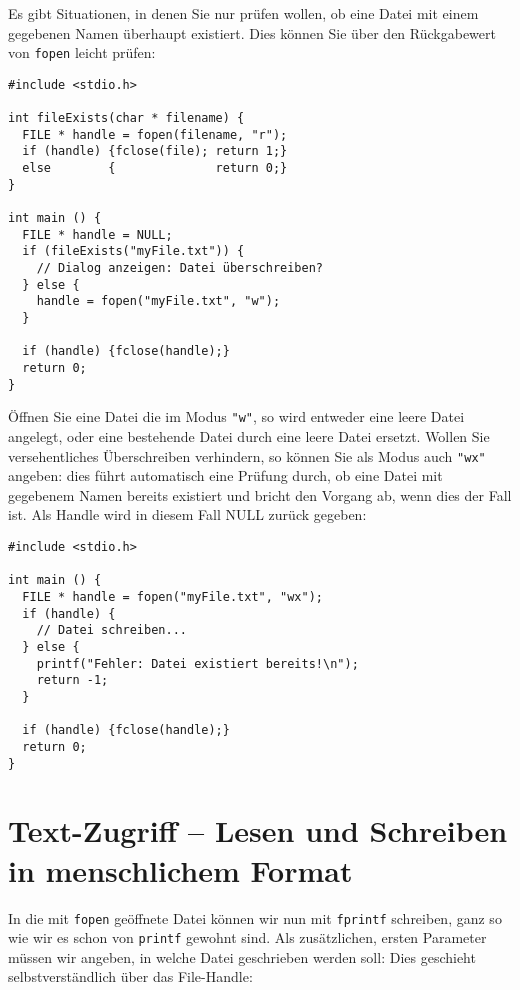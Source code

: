\begin{hintbox}
Es gibt Situationen, in denen Sie nur prüfen wollen, ob eine Datei mit einem gegebenen Namen überhaupt existiert. Dies können Sie über den Rückgabewert von \texttt{fopen} leicht prüfen:

\begin{codebox}
\begin{verbatim}
#include <stdio.h>

int fileExists(char * filename) {
  FILE * handle = fopen(filename, "r");
  if (handle) {fclose(file); return 1;}
  else        {              return 0;}
}

int main () {
  FILE * handle = NULL;
  if (fileExists("myFile.txt")) {
    // Dialog anzeigen: Datei überschreiben?
  } else {
    handle = fopen("myFile.txt", "w");
  }
  
  if (handle) {fclose(handle);}
  return 0;
}
\end{verbatim}
\end{codebox}
\end{hintbox}

\begin{hintbox}
Öffnen Sie eine Datei die im Modus \texttt{"w"}, so wird entweder eine leere Datei angelegt, oder eine bestehende Datei durch eine leere Datei ersetzt. Wollen Sie versehentliches Überschreiben verhindern, so können Sie als Modus auch \texttt{"wx"} angeben: dies führt automatisch eine Prüfung durch, ob eine Datei mit gegebenem Namen bereits existiert und bricht den Vorgang ab, wenn dies der Fall ist. Als Handle wird in diesem Fall NULL zurück gegeben:

\begin{codebox}
\begin{verbatim}
#include <stdio.h>

int main () {
  FILE * handle = fopen("myFile.txt", "wx");
  if (handle) {
    // Datei schreiben...
  } else {
    printf("Fehler: Datei existiert bereits!\n");
    return -1;
  }
  
  if (handle) {fclose(handle);}
  return 0;
}
\end{verbatim}
\end{codebox}
\end{hintbox}

\section{Text-Zugriff -- Lesen und Schreiben in menschlichem Format} \label{sec:humanAccess}
In die mit \texttt{fopen} geöffnete Datei können wir nun mit \texttt{fprintf} schreiben, ganz so wie wir es schon von \texttt{printf} gewohnt sind. Als zusätzlichen, ersten Parameter müssen wir angeben, in welche Datei geschrieben werden soll: Dies geschieht selbstverständlich über das File-Handle:

